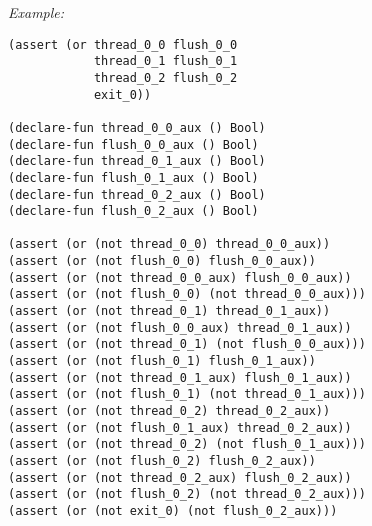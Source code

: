 \newpage

\noindent
\emph{Example:} 

\begin{lstlisting}[style=smtlib]
(assert (or thread_0_0 flush_0_0
            thread_0_1 flush_0_1
            thread_0_2 flush_0_2
            exit_0))

(declare-fun thread_0_0_aux () Bool)
(declare-fun flush_0_0_aux () Bool)
(declare-fun thread_0_1_aux () Bool)
(declare-fun flush_0_1_aux () Bool)
(declare-fun thread_0_2_aux () Bool)
(declare-fun flush_0_2_aux () Bool)

(assert (or (not thread_0_0) thread_0_0_aux))
(assert (or (not flush_0_0) flush_0_0_aux))
(assert (or (not thread_0_0_aux) flush_0_0_aux))
(assert (or (not flush_0_0) (not thread_0_0_aux)))
(assert (or (not thread_0_1) thread_0_1_aux))
(assert (or (not flush_0_0_aux) thread_0_1_aux))
(assert (or (not thread_0_1) (not flush_0_0_aux)))
(assert (or (not flush_0_1) flush_0_1_aux))
(assert (or (not thread_0_1_aux) flush_0_1_aux))
(assert (or (not flush_0_1) (not thread_0_1_aux)))
(assert (or (not thread_0_2) thread_0_2_aux))
(assert (or (not flush_0_1_aux) thread_0_2_aux))
(assert (or (not thread_0_2) (not flush_0_1_aux)))
(assert (or (not flush_0_2) flush_0_2_aux))
(assert (or (not thread_0_2_aux) flush_0_2_aux))
(assert (or (not flush_0_2) (not thread_0_2_aux)))
(assert (or (not exit_0) (not flush_0_2_aux)))
\end{lstlisting}


